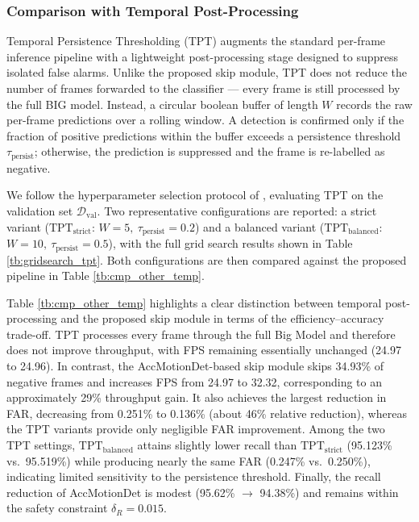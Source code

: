 \documentclass[
  10pt,
]{article}
\begin{document}
\subsubsection{Comparison with Temporal
Post-Processing}\label{sec:cmp-temporal}

Temporal Persistence Thresholding (TPT)
 augments the standard per-frame
inference pipeline with a lightweight post-processing stage designed to
suppress isolated false alarms. Unlike the proposed skip module, TPT
does not reduce the number of frames forwarded to the classifier ---
every frame is still processed by the full BIG model. Instead, a
circular boolean buffer of length \(W\) records the raw per-frame
predictions over a rolling window. A detection is confirmed only if the
fraction of positive predictions within the buffer exceeds a persistence
threshold \(\tau_\text{persist}\); otherwise, the prediction is
suppressed and the frame is re-labelled as negative.





We follow the hyperparameter selection protocol of
, evaluating TPT on the validation
set \(\mathcal{D}_\text{val}\). Two representative configurations are
reported: a strict variant (\(\text{TPT}_\text{strict}\):
\(W = 5,\ \tau_\text{persist} = 0.2\)) and a balanced variant
(\(\text{TPT}_\text{balanced}\): \(W = 10,\
\tau_\text{persist} = 0.5\)), with the full grid search results shown in
Table \ref{tb:gridsearch_tpt}. Both configurations are then compared
against the proposed pipeline in Table \ref{tb:cmp_other_temp}.

Table \ref{tb:cmp_other_temp} highlights a clear distinction between
temporal post-processing and the proposed skip module in terms of the
efficiency--accuracy trade-off. TPT processes every frame through the
full Big Model and therefore does not improve throughput, with FPS
remaining essentially unchanged (24.97 to 24.96). In contrast, the
AccMotionDet-based skip module skips 34.93\% of negative frames and
increases FPS from 24.97 to 32.32, corresponding to an approximately
29\% throughput gain. It also achieves the largest reduction in FAR,
decreasing from 0.251\% to 0.136\% (about 46\% relative reduction),
whereas the TPT variants provide only negligible FAR improvement. Among
the two TPT settings, \(\text{TPT}_\text{balanced}\) attains slightly
lower recall than \(\text{TPT}_\text{strict}\) (95.123\% vs.~95.519\%)
while producing nearly the same FAR (0.247\% vs.~0.250\%), indicating
limited sensitivity to the persistence threshold. Finally, the recall
reduction of AccMotionDet is modest (95.62\% \(\to\) 94.38\%) and
remains within the safety constraint \(\delta_R = 0.015\).
\end{document}
